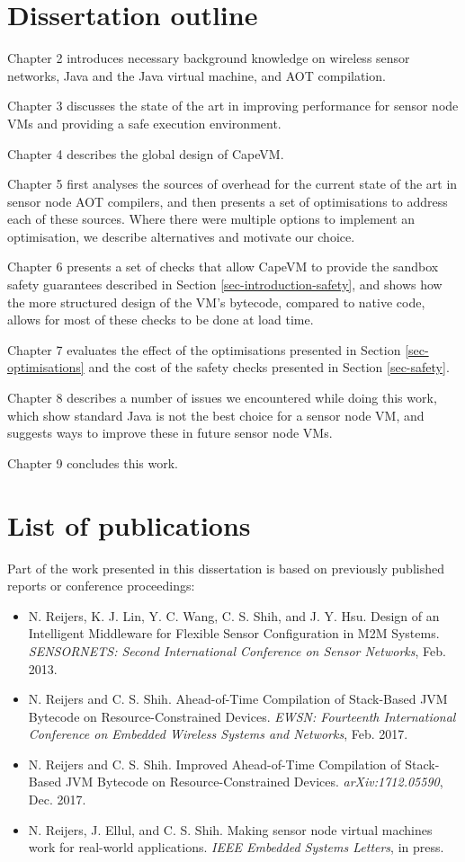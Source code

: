 \section{Dissertation outline}
Chapter 2 introduces necessary background knowledge on wireless sensor networks, Java and the Java virtual machine, and AOT compilation.

Chapter 3 discusses the state of the art in improving performance for sensor node VMs and providing a safe execution environment.

Chapter 4 describes the global design of CapeVM.

Chapter 5 first analyses the sources of overhead for the current state of the art in sensor node AOT compilers, and then presents a set of optimisations to address each of these sources. Where there were multiple options to implement an optimisation, we describe alternatives and motivate our choice.

Chapter 6 presents a set of checks that allow CapeVM to provide the sandbox safety guarantees described in Section \ref{sec-introduction-safety}, and shows how the more structured design of the VM's bytecode, compared to native code, allows for most of these checks to be done at load time.

Chapter 7 evaluates the effect of the optimisations presented in Section \ref{sec-optimisations} and the cost of the safety checks presented in Section \ref{sec-safety}.

Chapter 8 describes a number of issues we encountered while doing this work, which show standard Java is not the best choice for a sensor node VM, and suggests ways to improve these in future sensor node VMs.

Chapter 9 concludes this work.

\section{List of publications}
Part of the work presented in this dissertation is based on previously published reports or conference proceedings:

\begin{itemize}
    \item N. Reijers, K. J. Lin, Y. C. Wang, C. S. Shih, and J. Y. Hsu. Design of an Intelligent Middleware for Flexible Sensor Configuration in M2M Systems. \emph{SENSORNETS: Second International Conference on Sensor Networks}, Feb. 2013.
    \item N. Reijers and C. S. Shih. Ahead-of-Time Compilation of Stack-Based JVM Bytecode on Resource-Constrained Devices. \emph{EWSN: Fourteenth International Conference on Embedded Wireless Systems and Networks}, Feb. 2017.
    \item N. Reijers and C. S. Shih. Improved Ahead-of-Time Compilation of Stack-Based JVM Bytecode on Resource-Constrained Devices. \emph{arXiv:1712.05590}, Dec. 2017.
    \item N. Reijers, J. Ellul, and C. S. Shih. Making sensor node virtual machines work for real-world applications. \emph{IEEE Embedded Systems Letters}, in press.
\end{itemize}

